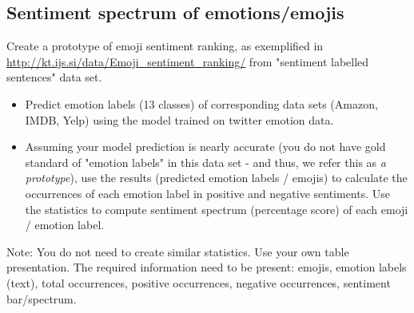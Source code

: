 \documentclass[a4paper,twoside,10pt]{article}
\begin{document}
\subsection*{Sentiment spectrum of emotions/emojis}

\justify
Create a prototype of emoji sentiment ranking, as exemplified in \url{http://kt.ijs.si/data/Emoji_sentiment_ranking/} from "sentiment labelled sentences" data set.

\begin{itemize}
    \item Predict emotion labels (13 classes) of corresponding data sets (Amazon, IMDB, Yelp) using the model trained on twitter emotion data.
    \item Assuming your model prediction is nearly accurate (you do not have gold standard of "emotion labels" in this data set - and thus, we refer this as \textit{a prototype}), use the results (predicted emotion labels / emojis) to calculate the occurrences of each emotion label in positive and negative sentiments. Use the statistics to compute sentiment spectrum (percentage score) of each emoji / emotion label.    
\end{itemize}

\justify
Note: You do not need to create similar statistics. Use your own table presentation. The required information need to be present: emojis, emotion labels (text), total occurrences, positive occurrences, negative occurrences, sentiment bar/spectrum. 
\end{document}
